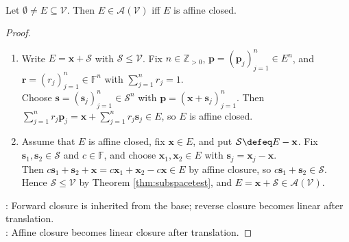 \begin{theorem} \label{thm:flats-are-affine-closed} \\
Let $\emptyset\neq E\subseteq\mathcal{V}$. Then $E\in\mathcal{A}(\mathcal{V})$ iff $E$ is affine closed.
\begin{proof}
\begin{enumerate}[label=\roman*.]
\setlength{\itemsep}{0pt}
\item[$(\Rightarrow)$] Write $E=\mathbf{x}+\mathcal{S}$ with $\mathcal{S}\leq\mathcal{V}$. Fix $n\in\mathbb{Z}_{>0}$, $\mathbf{p}=(\mathbf{p}_j)_{j=1}^n\in E^n$, and $\mathbf{r}=(r_j)_{j=1}^n\in\mathbb{F}^n$ with $\sum\limits_{j=1}^n r_j=1$.\\
Choose $\mathbf{s}=(\mathbf{s}_j)_{j=1}^n\in\mathcal{S}^n$ with $\mathbf{p}=(\mathbf{x}+\mathbf{s}_j)_{j=1}^n$. Then $\sum\limits_{j=1}^n r_j\mathbf{p}_j=\mathbf{x}+\sum\limits_{j=1}^n r_j\mathbf{s}_j\in E$, so $E$ is affine closed.
\item[$(\Leftarrow)$] Assume that $E$ is affine closed, fix $\mathbf{x}\in E$, and put $\mathcal{S}\defeq E-\mathbf{x}$. Fix $\mathbf{s}_1,\mathbf{s}_2\in\mathcal{S}$ and $c\in\mathbb{F}$, and choose $\mathbf{x}_1,\mathbf{x}_2\in E$ with $\mathbf{s}_j=\mathbf{x}_j-\mathbf{x}$.\\
Then $c\mathbf{s}_1+\mathbf{s}_2+\mathbf{x}=c\mathbf{x}_1+\mathbf{x}_2-c\mathbf{x}\in E$ by affine closure, so $c\mathbf{s}_1+\mathbf{s}_2\in\mathcal{S}$. Hence $\mathcal{S}\leq\mathcal{V}$ by Theorem \ref{thm:subspacetest}, and $E=\mathbf{x}+\mathcal{S}\in\mathcal{A}(\mathcal{V})$.
\end{enumerate}
: Forward closure is inherited from the base; reverse closure becomes linear after translation.\\
: Affine closure becomes linear closure after translation.
\end{proof}
\end{theorem}

